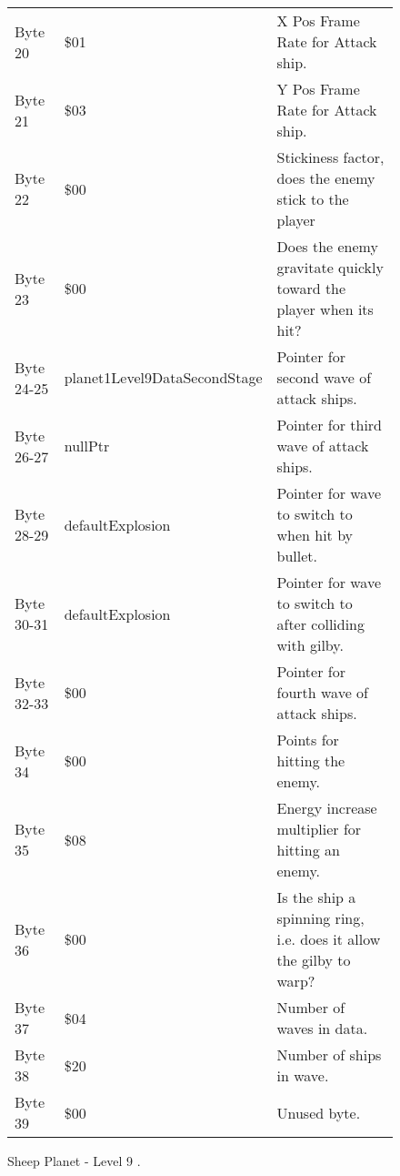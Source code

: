 \begin{figure}[H]
{\begin{adjustbox}{width=12cm}
\begin{tabular}{lll}
 Byte 20    & \$01                          & X Pos Frame Rate for Attack ship.                                   \\
 Byte 21    & \$03                          & Y Pos Frame Rate for Attack ship.                                   \\
 Byte 22    & \$00                          & Stickiness factor, does the enemy stick to the player               \\
 Byte 23    & \$00                          & Does the enemy gravitate quickly toward the player when its hit?    \\
 Byte 24-25 & planet1Level9DataSecondStage & Pointer for second wave of attack ships.                            \\
 Byte 26-27 & nullPtr                      & Pointer for third wave of attack ships.                             \\
 Byte 28-29 & defaultExplosion             & Pointer for wave to switch to when hit by bullet.                   \\
 Byte 30-31 & defaultExplosion             & Pointer for  wave to switch to after colliding with gilby.          \\
 Byte 32-33 & \$00                          & Pointer for fourth wave of attack ships.                            \\
 Byte 34    & \$00                          & Points for hitting the enemy.                                       \\
 Byte 35    & \$08                          & Energy increase multiplier for hitting an enemy.                    \\
 Byte 36    & \$00                          & Is the ship a spinning ring, i.e. does it allow the gilby to warp?  \\
 Byte 37    & \$04                          & Number of waves in data.                                            \\
 Byte 38    & \$20                          & Number of ships in wave.                                            \\
 Byte 39    & \$00                          & Unused byte.                                                        \\
\bottomrule
\end{tabular}

  \end{adjustbox}

  }\caption*{Sheep Planet - Level 9
.}
\end{figure}

